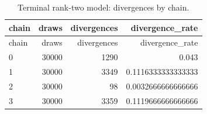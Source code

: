 \documentclass[pdftex,12pt,openright,a4paper,oneside]{book}
\begin{document}
\begin{longtable}{@{}p{}rrr@{}}

\caption{Terminal rank-two model: divergences by chain.}\label{tab:terminal_rank2_divergences}\\

\toprule

chain & draws & divergences & divergence\_rate \\

\midrule\endfirsthead

\toprule

chain & draws & divergences & divergence\_rate \\

\midrule\endhead

0 & 30000 & 1290 & 0.043 \\

1 & 30000 & 3349 & 0.1116333333333333 \\

2 & 30000 & 98 & 0.0032666666666666 \\

3 & 30000 & 3359 & 0.1119666666666666 \\

\bottomrule\end{longtable}
\end{document}
